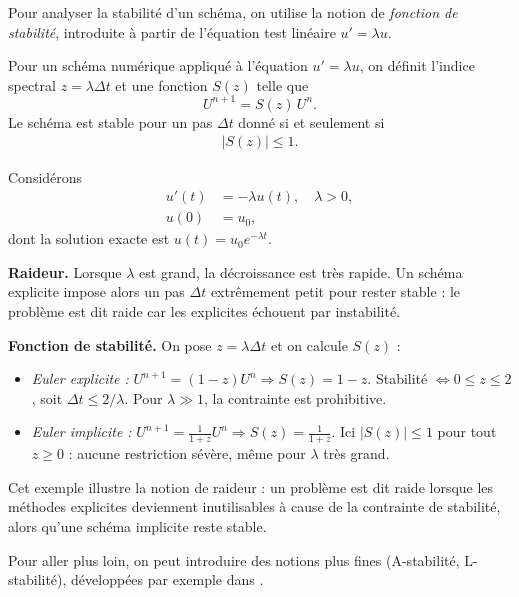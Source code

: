 Pour analyser la stabilité d'un schéma, on utilise la notion de \emph{fonction de stabilité}, introduite à partir de l'équation test linéaire $u'=\lambda u$.

\begin{definition}
Pour un schéma numérique appliqué à l'équation $u'=\lambda u$, on définit l'indice spectral $z=\lambda \Delta t$ et une fonction $S(z)$ telle que
\[
U^{n+1} = S(z)\,U^n.
\]
Le schéma est stable pour un pas $\Delta t$ donné si et seulement si
\begin{align}
    |S(z)| \leq 1.
\end{align}
\end{definition}

\begin{exemple}
Considérons
\begin{align}
    u'(t) &= -\lambda u(t), \quad \lambda>0, \\
    u(0) &= u_0,
\end{align}
dont la solution exacte est $u(t)=u_0 e^{-\lambda t}$.

\textbf{Raideur.}  
Lorsque $\lambda$ est grand, la décroissance est très rapide.  
Un schéma explicite impose alors un pas $\Delta t$ extrêmement petit pour rester stable : le problème est dit raide car les explicites échouent par instabilité.

\textbf{Fonction de stabilité.}  
On pose $z=\lambda \Delta t$ et on calcule $S(z)$ :
\begin{itemize}
    \item \emph{Euler explicite :} $U^{n+1}=(1-z)U^n \Rightarrow S(z)=1-z$.  
          Stabilité $\iff 0\leq z\leq 2$, soit $\Delta t \leq 2/\lambda$.  
          Pour $\lambda\gg 1$, la contrainte est prohibitive.
    \item \emph{Euler implicite :} $U^{n+1}=\tfrac{1}{1+z}U^n \Rightarrow S(z)=\tfrac{1}{1+z}$.  
          Ici $|S(z)|\leq 1$ pour tout $z\geq 0$ : aucune restriction sévère, même pour $\lambda$ très grand.
\end{itemize}

Cet exemple illustre la notion de raideur : un problème est dit raide lorsque les méthodes explicites deviennent inutilisables à cause de la contrainte de stabilité, alors qu'une schéma implicite reste stable.
\end{exemple}

Pour aller plus loin, on peut introduire des notions plus fines (A-stabilité, L-stabilité), développées par exemple dans \cite{HairerAndWanner1}.


